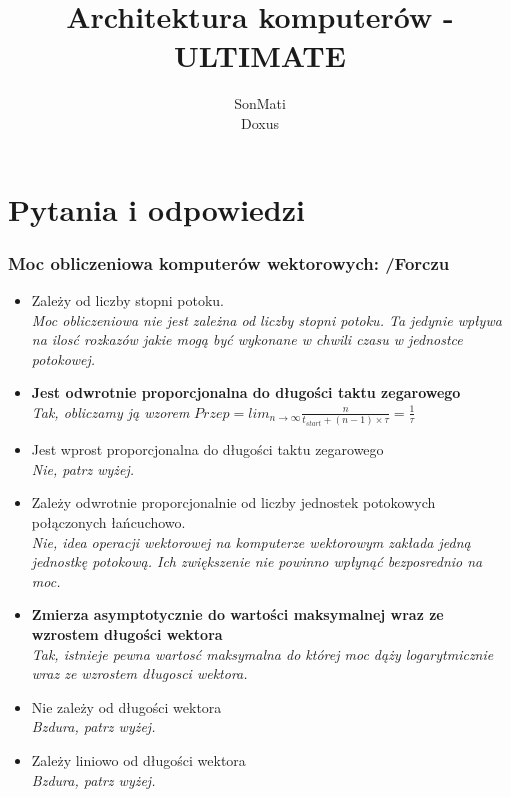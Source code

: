 \documentclass[a4paper,twoside]{article}
\begin{document}




\begin{titlepage}
\title{\huge Architektura komputerów - ULTIMATE}
\author{\large SonMati \\ Doxus}
\maketitle
\end{titlepage}

\part*{Pytania i odpowiedzi}
\section{Moc obliczeniowa komputerów wektorowych: {\small /Forczu}}
	\begin{itemize}
    \item Zależy od liczby stopni potoku.\\
    {\small \emph{Moc obliczeniowa nie jest zależna od liczby stopni potoku. Ta jedynie wpływa na ilosć rozkazów jakie mogą być wykonane w chwili czasu w jednostce potokowej.}}
    \item \textbf{Jest odwrotnie proporcjonalna do długości taktu zegarowego}\\
    {\small \emph{Tak, obliczamy ją wzorem} $Przep=lim_{n \to \infty}\frac{n}{t_{start}+(n-1)\times\tau}=\frac{1}{\tau}$}
    \item Jest wprost proporcjonalna do długości taktu zegarowego\\
    {\small \emph{Nie, patrz wyżej.}}
    \item Zależy odwrotnie proporcjonalnie od liczby jednostek potokowych połączonych łańcuchowo.\\
    {\small \emph{Nie, idea operacji wektorowej na komputerze wektorowym zakłada jedną jednostkę potokową. Ich zwiększenie nie powinno wpłynąć bezposrednio na moc.}}
    \item \textbf{Zmierza asymptotycznie do wartości maksymalnej wraz ze wzrostem długości wektora}\\
    {\small \emph{Tak, istnieje pewna wartosć maksymalna do której moc dąży logarytmicznie wraz ze wzrostem długosci wektora.}}
    \item Nie zależy od długości wektora\\
    {\small \emph{Bzdura, patrz wyżej.}}
    \item Zależy liniowo od długości wektora\\
    {\small \emph{Bzdura, patrz wyżej.}}
    \end{itemize}
\end{document}
